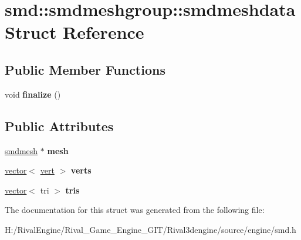 \hypertarget{structsmd_1_1smdmeshgroup_1_1smdmeshdata}{}\section{smd\+:\+:smdmeshgroup\+:\+:smdmeshdata Struct Reference}
\label{structsmd_1_1smdmeshgroup_1_1smdmeshdata}
\subsection*{Public Member Functions}
\begin{DoxyCompactItemize}
\item 
\mbox{\label{structsmd_1_1smdmeshgroup_1_1smdmeshdata_a65064e77b8ac6d7c194d4f26d3c4ed44}} 
void {\bfseries finalize} ()
\end{DoxyCompactItemize}
\subsection*{Public Attributes}
\begin{DoxyCompactItemize}
\item 
\mbox{\label{structsmd_1_1smdmeshgroup_1_1smdmeshdata_a4687ce0c0fc7d99ba108e14152d724f8}} 
\hyperlink{structsmd_1_1smdmesh}{smdmesh} $\ast$ {\bfseries mesh}
\item 
\mbox{\label{structsmd_1_1smdmeshgroup_1_1smdmeshdata_aca677908d3be461134fb6b15394240e5}} 
\hyperlink{structvector}{vector}$<$ \hyperlink{structskelmodel_1_1vert}{vert} $>$ {\bfseries verts}
\item 
\mbox{\label{structsmd_1_1smdmeshgroup_1_1smdmeshdata_a5cac395c720b3ba6e8f94c2c0b24cbef}} 
\hyperlink{structvector}{vector}$<$ tri $>$ {\bfseries tris}
\end{DoxyCompactItemize}


The documentation for this struct was generated from the following file\+:\begin{DoxyCompactItemize}
\item 
H\+:/\+Rival\+Engine/\+Rival\+\_\+\+Game\+\_\+\+Engine\+\_\+\+G\+I\+T/\+Rival3dengine/source/engine/smd.\+h\end{DoxyCompactItemize}

